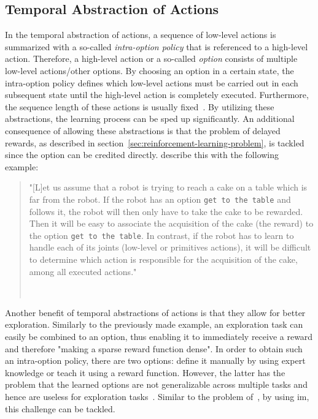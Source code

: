\documentclass[draft,final]{vutinfth} %
\newcommand{\p}[1]{see p. #1}
\begin{document}
    \subsection{Temporal Abstraction of Actions}\label{subsec:temporal-abstraction-of-actions}

    In the temporal abstraction of actions, a sequence of low-level actions is summarized with a so-called \textit{intra-option policy} that is referenced to a high-level action.
    Therefore, a high-level action or a so-called \textit{option} consists of multiple low-level actions/other options.
    By choosing an option in a certain state, the intra-option policy defines which low-level actions must be carried out in each subsequent state until the high-level action is completely executed.
    Furthermore, the sequence length of these actions is usually fixed~\citep{aubret_survey_2019}.
    By utilizing these abstractions, the learning process can be sped up significantly.
    An additional consequence of allowing these abstractions is that the problem of delayed rewards, as described in section~\ref{sec:reinforcement-learning-problem}, is tackled since the option can be credited directly.
    \citeauthor{aubret_survey_2019} describe this with the following example:

    \begin{quote}
        "[L]et us assume that a robot is trying to reach a cake on a table which is far from the robot.
        If the robot has an option \texttt{get to the table} and follows it, the robot will then only have to take the cake to be rewarded.
        Then it will be easy to associate the acquisition of the cake (the reward) to the option \texttt{get to the table}.
        In contrast, if the robot has to learn to handle each of its joints (low-level or primitives actions), it will be difficult to determine which action is responsible for the acquisition of the cake, among all executed actions."

        \hfill~\cite[\p{5f}]{aubret_survey_2019}
    \end{quote}

    Another benefit of temporal abstractions of actions is that they allow for better exploration.
    Similarly to the previously made example, an exploration task can easily be combined to an option, thus enabling it to immediately receive a reward and therefore "making a sparse reward function dense".
    In order to obtain such an intra-option policy, there are two options: define it manually by using expert knowledge or teach it using a reward function.
    However, the latter has the problem that the learned options are not generalizable across multiple tasks and hence are useless for exploration tasks~\citep{aubret_survey_2019}.
    Similar to the problem of~, by using \gls{im}, this challenge can be tackled.
\end{document}
